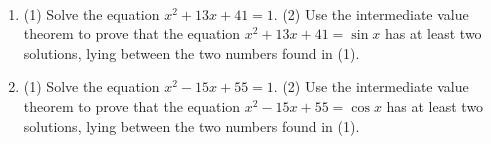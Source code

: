 ~
\begin{enumerate}[ref={\fcProblemRef}]
\item \label{problemIVTtoshowx^2+13x+14=sinx-has-solutions} (1) Solve the equation $x^2+13x+41=1$.  (2) Use the intermediate value theorem to prove that the equation $x^2+13x+41=\sin  x$ has at least two solutions, lying between the two numbers found in (1).
\item (1) Solve the equation $x^2-15x+55=1$.  (2) Use the intermediate value theorem to prove that the equation $x^2-15x+55=\cos  x$ has at least two solutions, lying between the two numbers found in (1).
\end{enumerate}
